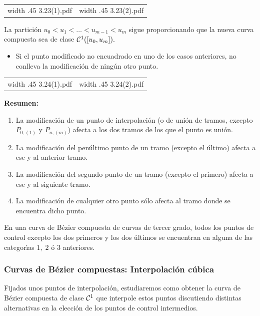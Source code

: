 \documentclass[twoside]{report}
\newcommand{\colocapdf}[2]{\quad\pdfimage width #2 {#1.pdf}}
\begin{document}
\begin{center}
\begin{tabular}{cc}
\colocapdf{3.23(1)}{.45\textwidth} &
\colocapdf{3.23(2)}{.45\textwidth}
\end{tabular}
\end{center}

La partici\'{o}n $u_0<u_1<\ldots<u_{m-1}<u_m$ sigue proporcionando que la nueva curva compuesta sea de clase ${\cal C}^1([u_0,u_m]).$

\begin{itemize}
\item Si el punto modificado no encuadrado en uno de los casos anteriores, no conlleva la modificaci\'{o}n de ning\'{u}n otro punto.
\end{itemize}

\begin{center}
\begin{tabular}{cc}
\colocapdf{3.24(1)}{.45\textwidth} &
\colocapdf{3.24(2)}{.45\textwidth}
\end{tabular}
\end{center}

{\bf Resumen:}

\begin{enumerate}
\item La modificaci\'{o}n de un punto de interpolaci\'{o}n (o de uni\'{o}n de tramos, excepto $P_{0,(1)}$  y $P_{n, (m)}$) afecta a los dos tramos de los que el punto es uni\'{o}n.
\item La modificaci\'{o}n del pen\'{u}ltimo punto de un tramo (excepto el \'{u}ltimo) afecta a ese y al anterior tramo.
\item La modificaci\'{o}n del segundo punto de un tramo (excepto el primero) afecta a ese y al siguiente tramo.
\item La modificaci\'{o}n de cualquier otro punto s\'{o}lo afecta al tramo donde se encuentra dicho punto.
\end{enumerate}

En una curva de B\'{e}zier compuesta de curvas de tercer grado, todos los puntos de control excepto los dos primeros y los dos \'{u}ltimos se encuentran en alguna de las categor\'{\i}as $1,\;2$ \'{o} $3$ anteriores.

\subsubsection{Curvas de B\'{e}zier compuestas: Interpolaci\'{o}n c\'{u}bica}

Fijados unos puntos de interpolaci\'{o}n, estudiaremos como obtener la curva de B\'{e}zier compuesta de clase ${\cal C}^1$ que interpole estos puntos discutiendo distintas alternativas en la elecci\'{o}n de los puntos de control intermedios.
\end{document}
